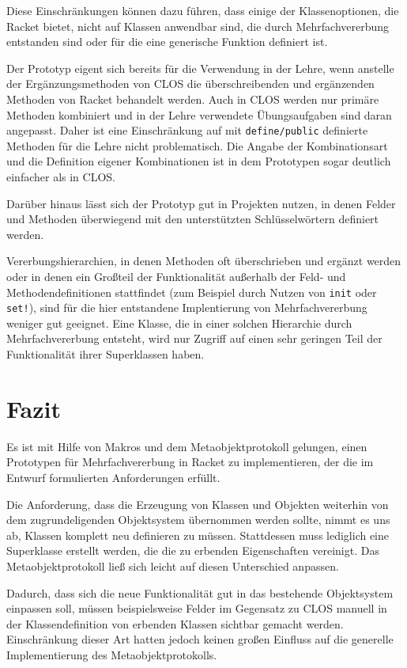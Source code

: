 Diese Einschränkungen können dazu führen, dass einige der Klassenoptionen, die Racket bietet, nicht auf Klassen anwendbar sind, die durch Mehrfachvererbung entstanden sind oder für die eine generische Funktion definiert ist.

Der Prototyp eigent sich bereits für die Verwendung in der Lehre, wenn anstelle der Ergänzungsmethoden von CLOS die überschreibenden und ergänzenden Methoden von Racket behandelt werden. Auch in CLOS werden nur primäre Methoden kombiniert und in der Lehre verwendete Übungsaufgaben sind daran angepasst. Daher ist eine Einschränkung auf mit \texttt{define/public} definierte Methoden für die Lehre nicht problematisch. Die Angabe der Kombinationsart und die Definition eigener Kombinationen ist in dem Prototypen sogar deutlich einfacher als in CLOS.

Darüber hinaus lässt sich der Prototyp gut in Projekten nutzen, in denen Felder und Methoden überwiegend mit den unterstützten Schlüsselwörtern definiert werden. 

Vererbungshierarchien, in denen Methoden oft überschrieben und ergänzt werden oder in denen ein Großteil der Funktionalität außerhalb der Feld- und Methodendefinitionen stattfindet (zum Beispiel durch Nutzen von \texttt{init} oder \texttt{set!}), sind für die hier entstandene Implentierung von Mehrfachvererbung weniger gut geeignet. Eine Klasse, die in einer solchen Hierarchie durch Mehrfachvererbung entsteht, wird nur Zugriff auf einen sehr geringen Teil der Funktionalität ihrer Superklassen haben.

\section{Fazit}
Es ist mit Hilfe von Makros und dem Metaobjektprotokoll gelungen, einen Prototypen für Mehrfachvererbung in Racket zu implementieren, der die im Entwurf formulierten Anforderungen erfüllt.

Die Anforderung, dass die Erzeugung von Klassen und Objekten weiterhin von dem zugrundeligenden Objektsystem übernommen werden sollte, nimmt es uns ab, Klassen komplett neu definieren zu müssen. Stattdessen muss lediglich eine Superklasse erstellt werden, die die zu erbenden Eigenschaften vereinigt. Das Metaobjektprotokoll ließ sich leicht auf diesen Unterschied anpassen.

Dadurch, dass sich die neue Funktionalität gut in das bestehende Objektsystem einpassen soll, müssen beispielsweise Felder im Gegensatz zu CLOS manuell in der Klassendefinition von erbenden Klassen sichtbar gemacht werden. Einschränkung dieser Art hatten jedoch keinen großen Einfluss auf die generelle Implementierung des Metaobjektprotokolls.

